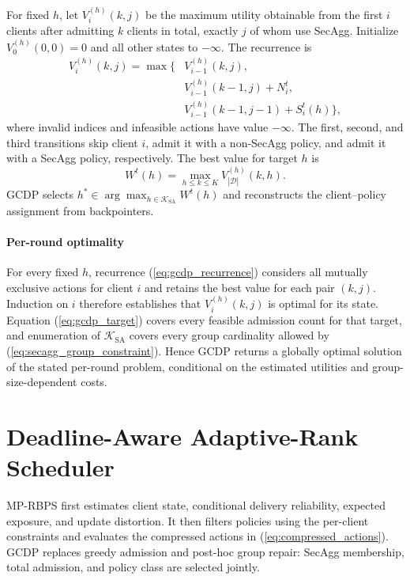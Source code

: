 \documentclass[preprint,12pt]{elsarticle}
\begin{document}
For fixed \(h\), let \(V_i^{(h)}(k,j)\) be the maximum utility obtainable from the first \(i\) clients after admitting \(k\) clients in total, exactly \(j\) of whom use SecAgg. Initialize \(V_0^{(h)}(0,0)=0\) and all other states to \(-\infty\). The recurrence is
\begin{equation}
\begin{aligned}
V_i^{(h)}(k,j)=\max\big\{&
V_{i-1}^{(h)}(k,j),\\
&V_{i-1}^{(h)}(k-1,j)+N_i^t,\\
&V_{i-1}^{(h)}(k-1,j-1)+S_i^t(h)
\big\},
\end{aligned}
\label{eq:gcdp_recurrence}
\end{equation}
where invalid indices and infeasible actions have value \(-\infty\). The first, second, and third transitions skip client \(i\), admit it with a non-SecAgg policy, and admit it with a SecAgg policy, respectively. The best value for target \(h\) is
\begin{equation}
	W^t(h)=\max_{h\leq k\leq K}V_{|\mathcal D|}^{(h)}(k,h).
	\label{eq:gcdp_target}
\end{equation}
GCDP selects \(h^*\in\arg\max_{h\in\mathcal K_{\mathrm{SA}}}W^t(h)\) and reconstructs the client--policy assignment from backpointers.

\paragraph{Per-round optimality}
For every fixed \(h\), recurrence (\ref{eq:gcdp_recurrence}) considers all mutually exclusive actions for client \(i\) and retains the best value for each pair \((k,j)\). Induction on \(i\) therefore establishes that \(V_i^{(h)}(k,j)\) is optimal for its state. Equation (\ref{eq:gcdp_target}) covers every feasible admission count for that target, and enumeration of \(\mathcal K_{\mathrm{SA}}\) covers every group cardinality allowed by (\ref{eq:secagg_group_constraint}). Hence GCDP returns a globally optimal solution of the stated per-round problem, conditional on the estimated utilities and group-size-dependent costs.

\section{Deadline-Aware Adaptive-Rank Scheduler}

MP-RBPS first estimates client state, conditional delivery reliability, expected exposure, and update distortion. It then filters policies using the per-client constraints and evaluates the compressed actions in (\ref{eq:compressed_actions}). GCDP replaces greedy admission and post-hoc group repair: SecAgg membership, total admission, and policy class are selected jointly.
\end{document}
